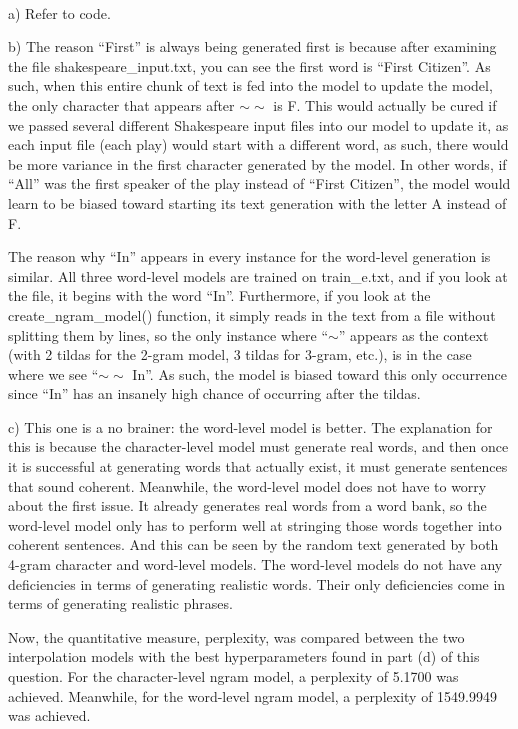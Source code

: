 \begin{solution} \ \\
a) Refer to code.	
	
b) The reason ``First'' is always being generated first is because after examining the file shakespeare\_input.txt, you can see the first word is ``First Citizen''. As such, when this entire chunk of text is fed into the model to update the model, the only character that appears after $\sim\sim$ is F. This would actually be cured if we passed several different Shakespeare input files into our model to update it, as each input file (each play) would start with a different word, as such, there would be more variance in the first character generated by the model. In other words, if ``All'' was the first speaker of the play instead of ``First Citizen'', the model would learn to be biased toward starting its text generation with the letter A instead of F.

The reason why ``In'' appears in every instance for the word-level generation is similar. All three word-level models are trained on train\_e.txt, and if you look at the file, it begins with the word ``In''. Furthermore, if you look at the create\_ngram\_model() function, it simply reads in the text from a file without splitting them by lines, so the only instance where ``$\sim$'' appears as the context (with 2 tildas for the 2-gram model, 3 tildas for 3-gram, etc.), is in the case where we see ``$\sim \sim$ In''. As such, the model is biased toward this only occurrence since ``In'' has an insanely high chance of occurring after the tildas.

c) This one is a no brainer: the word-level model is better. The explanation for this is because the character-level model must generate real words, and then once it is successful at generating words that actually exist, it must generate sentences that sound coherent. Meanwhile, the word-level model does not have to worry about the first issue. It already generates real words from a word bank, so the word-level model only has to perform well at stringing those words together into coherent sentences. And this can be seen by the random text generated by both 4-gram character and word-level models. The word-level models do not have any deficiencies in terms of generating realistic words. Their only deficiencies come in terms of generating realistic phrases. 

Now, the quantitative measure, perplexity, was compared between the two interpolation models with the best hyperparameters found in part (d) of this question. For the character-level ngram model, a perplexity of 5.1700 was achieved. Meanwhile, for the word-level ngram model, a perplexity of 1549.9949 was achieved. 


\end{solution}
